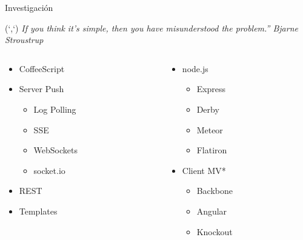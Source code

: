 \documentclass[xcolor=dvipsnames, 14pt]{beamer}
\newenvironment{reference}[2]{%
  \begin{textblock*}{\textwidth}(#1,#2)
      \footnotesize\it\bgroup\color{gray!50!black}}{\egroup\end{textblock*}}
\begin{document}
\begin{frame}{Investigación}
\begin{reference}{4mm}{85mm}
``If you think it's simple, then you have misunderstood the problem.'' Bjarne Stroustrup
\end{reference}

\begin{columns}

\begin{column}{0.5\textwidth}
    \begin{itemize}
    \item CoffeeScript
    \item Server Push
        \begin{itemize}
        \item Log Polling
        \item SSE
        \item WebSockets
        \item socket.io
        \end{itemize}
    \item REST
    \item Templates
    \end{itemize}
\end{column}

\begin{column}{0.5\textwidth}
    \begin{itemize}
    \item node.js
        \begin{itemize}
        \item Express
        \item Derby
        \item Meteor
        \item Flatiron
        \end{itemize}
    \item Client MV*
        \begin{itemize}
        \item Backbone
        \item Angular
        \item Knockout
        \end{itemize}
    \end{itemize}
\end{column}

\end{columns}

\end{frame}
\end{document}
